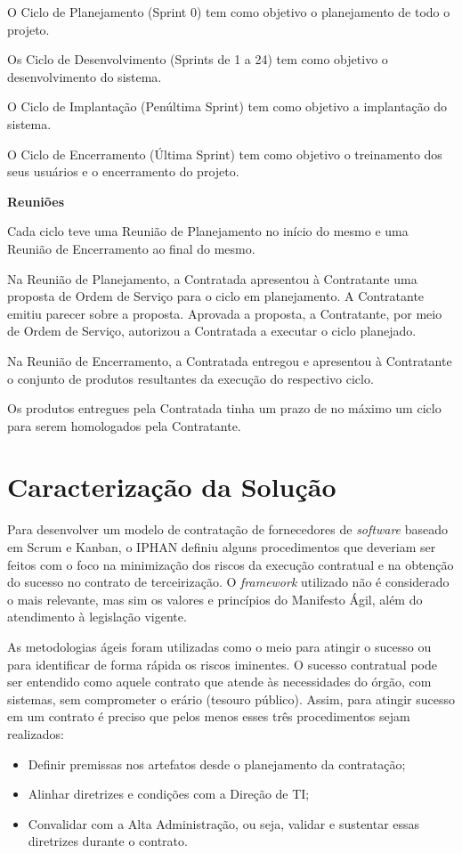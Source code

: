 O Ciclo de Planejamento (Sprint 0) tem como objetivo o planejamento de todo o projeto.

Os Ciclo de Desenvolvimento (Sprints de 1 a 24) tem como objetivo o desenvolvimento do sistema.

O Ciclo de Implantação (Penúltima Sprint) tem como objetivo a implantação do sistema.

O Ciclo de Encerramento (Última Sprint) tem como objetivo o treinamento dos seus usuários e o encerramento do projeto.

\textbf{Reuniões}

Cada ciclo teve uma Reunião de Planejamento no início do mesmo e uma Reunião de Encerramento ao final do mesmo.

Na Reunião de Planejamento, a Contratada apresentou à Contratante uma proposta de Ordem de Serviço para o ciclo em planejamento. A Contratante emitiu parecer sobre a proposta. Aprovada a proposta, a Contratante, por meio de Ordem de Serviço, autorizou a Contratada a executar o ciclo planejado.

Na Reunião de Encerramento, a Contratada entregou e apresentou à Contratante o conjunto de produtos resultantes da execução do respectivo ciclo.

Os produtos entregues pela Contratada tinha um prazo de no máximo um ciclo para serem homologados pela Contratante.

\section[Caracterização da Solução]{Caracterização da Solução}

Para desenvolver um modelo de contratação de fornecedores de \textit{software} baseado em Scrum e Kanban, o IPHAN definiu alguns procedimentos que deveriam ser feitos com o foco na minimização dos riscos da execução contratual e na obtenção do sucesso no contrato de terceirização. O \textit{framework} utilizado não é considerado o mais relevante, mas sim os valores e princípios do Manifesto Ágil, além do atendimento à legislação vigente. 

As metodologias ágeis foram utilizadas como o meio para atingir o sucesso ou para identificar de forma rápida os riscos iminentes. O sucesso contratual pode ser entendido como aquele contrato que atende às necessidades do órgão, com sistemas, sem comprometer o erário (tesouro público). Assim, para atingir sucesso em um contrato é preciso que pelos menos esses três procedimentos sejam realizados: 
\begin{itemize}
\item Definir premissas nos artefatos desde o planejamento da contratação;
\item Alinhar diretrizes e condições com a Direção de TI;
\item Convalidar com a Alta Administração, ou seja, validar e sustentar essas diretrizes durante o contrato.
\end{itemize}


